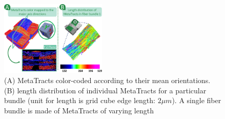 


\begin{figure}[tb]
\centering
	\includegraphics[width=0.45\textwidth]{images_pvis/figure5.png}
	\caption{(A) MetaTracts color-coded according to their mean orientations. (B) length distribution of individual MetaTracts for a particular bundle (unit for length is grid cube edge length:  $2\mu m$). A single fiber bundle is made of MetaTracts of varying length}
	\label{fig:length_distribution}
\end{figure}


